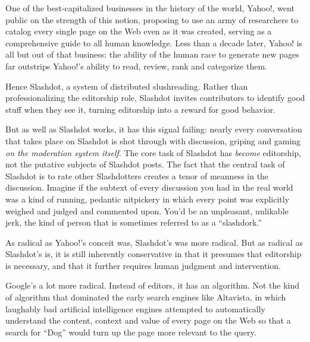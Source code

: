 One of the best-capitalized businesses in the history of the world,
Yahoo!, went public on the strength of this notion, proposing to
use an army of researchers to catalog every single page on the Web
even as it was created, serving as a comprehensive guide to all
human knowledge. Less than a decade later, Yahoo! is all but out of
that business: the ability of the human race to generate new pages
far outstrips Yahoo!'s ability to read, review, rank and categorize
them.

Hence Slashdot, a system of distributed slushreading. Rather than
professionalizing the editorship role, Slashdot invites
contributors to identify good stuff when they see it, turning
editorship into a reward for good behavior.

But as well as Slashdot works, it has this signal failing: nearly
every conversation that takes place on Slashdot is shot through
with discussion, griping and gaming
\emph{on the moderation system itself}. The core task of Slashdot
has \emph{become} editorship, not the putative subjects of
Slashdot posts. The fact that the central task of Slashdot is to
rate other Slashdotters creates a tenor of meanness in the
discussion. Imagine if the subtext of every discussion you had in
the real world was a kind of running, pedantic nitpickery in which
every point was explicitly weighed and judged and commented upon.
You'd be an unpleasant, unlikable jerk, the kind of person that is
sometimes referred to as a ``slashdork.''

As radical as Yahoo!'s conceit was, Slashdot's was more radical.
But as radical as Slashdot's is, it is still inherently
conservative in that it presumes that editorship is necessary, and
that it further requires human judgment and intervention.

Google's a lot more radical. Instead of editors, it has an
algorithm. Not the kind of algorithm that dominated the early
search engines like Altavista, in which laughably bad artificial
intelligence engines attempted to automatically understand the
content, context and value of every page on the Web so that a
search for ``Dog'' would turn up the page more relevant to the
query.

